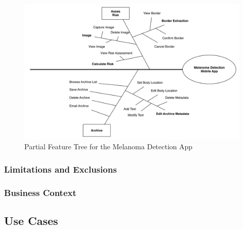         \begin{figure}[H]
            \centering
            \includegraphics[width=\textwidth]{assets/requirements/PartialFeatureTree.pdf}
            \caption{Partial Feature Tree for the Melanoma Detection App}
            \label{fig:partial_feature_tree}
        \end{figure}


    \subsubsection{Limitations and Exclusions}
    \subsubsection{Business Context}
    \subsection{Use Cases}

